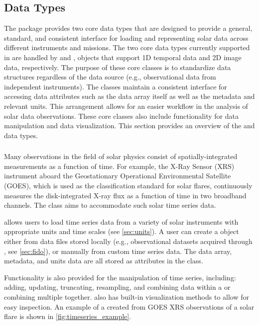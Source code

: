 \subsection{Data Types}
\label{sec:data_types}

The \sunpypkg package provides two core data types that are designed to provide a general, standard, and consistent interface for loading and representing solar data across different instruments and missions.
The two core data types currently supported in \sunpypkg are handled by \Timeseries and \Map, objects that support 1D temporal data and 2D image data, respectively.
The purpose of these core classes is to standardize data structures regardless of the data source (e.g., observational data from independent instruments).
The classes maintain a consistent interface for accessing data attributes such as the data array itself as well as the metadata and relevant units.
This arrangement allows for an easier workflow in the analysis of solar data observations.
These core classes also include functionality for data manipulation and data visualization.
This section provides an overview of the \Timeseries and \Map data types.

\subsubsection{\Timeseries}
\label{sec:timeseries}
Many observations in the field of solar physics consist of spatially-integrated measurements as a function of time.
For example, the X-Ray Sensor (XRS) instrument aboard the Geostationary Operational Environmental Satellite (GOES), which is used as the classification standard for solar flares, continuously measures the disk-integrated X-ray flux as a function of time in two broadband channels.
The \Timeseries class aims to accommodate such solar time series data.

\Timeseries allows users to load time series data from a variety of solar instruments with appropriate units and time scales (see \autoref{sec:units}).
 A user can create a \Timeseries object either from data files stored locally (e.g., observational datasets acquired through \Fido, see \autoref{sec:fido}), or manually from custom time series data.
 The data array, metadata, and units data are all stored as attributes in the \Timeseries class.

Functionality is also provided for the manipulation of time series, including: adding, updating, truncating, resampling, and combining data within a \Timeseries or combining multiple \Timeseries together.
\Timeseries also has built-in visualization methods to allow for easy inspection.
An example of a \Timeseries created from GOES XRS observations of a solar flare is shown in \autoref{fig:timeseries_example}.

